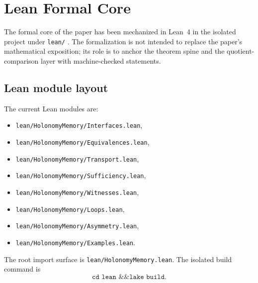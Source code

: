 \documentclass[11pt]{article}
\theoremstyle{definition}
\begin{document}
\section{Lean Formal Core}\label{app:lean-core}
The formal core of the paper has been mechanized in Lean~4 in the isolated project under \texttt{lean/} \citep{deMouraUllrich2021Lean4}. The formalization is not intended to replace the paper’s mathematical exposition; its role is to anchor the theorem spine and the quotient-comparison layer with machine-checked statements.

\subsection{Lean module layout}\label{appsubsec:lean-layout}
The current Lean modules are:
\begin{itemize}
\item \texttt{lean/HolonomyMemory/Interfaces.lean},
\item \texttt{lean/HolonomyMemory/Equivalences.lean},
\item \texttt{lean/HolonomyMemory/Transport.lean},
\item \texttt{lean/HolonomyMemory/Sufficiency.lean},
\item \texttt{lean/HolonomyMemory/Witnesses.lean},
\item \texttt{lean/HolonomyMemory/Loops.lean},
\item \texttt{lean/HolonomyMemory/Asymmetry.lean},
\item \texttt{lean/HolonomyMemory/Examples.lean}.
\end{itemize}
The root import surface is \texttt{lean/HolonomyMemory.lean}. The isolated build command is
\[
\texttt{cd lean \&\& lake build}.
\]
\end{document}
